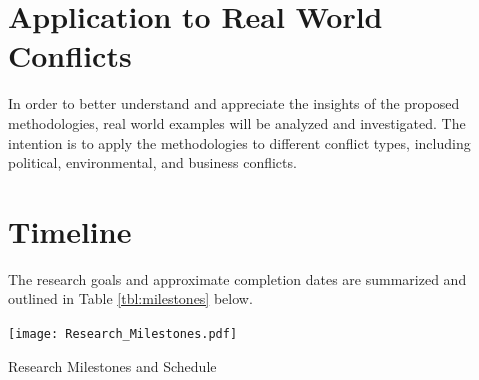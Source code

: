 \documentclass[letterpaper,12pt,titlepage,oneside,final]{book}
\let\origdoublepage\cleardoublepage
\newcommand{\clearemptydoublepage}{%
  \clearpage{\pagestyle{empty}\origdoublepage}}
\let\cleardoublepage\clearemptydoublepage
\begin{document}
\section{Application to Real World Conflicts}
In order to better understand and appreciate the insights of the proposed methodologies, real world examples will be analyzed and investigated. The intention is to apply the methodologies to different conflict types, including political, environmental, and business conflicts.
\section{Timeline}
The research goals and approximate completion dates are summarized and outlined in Table \ref{tbl:milestones} below.
\begin{table}[H]
\centering
\texttt{[image: Research\_Milestones.pdf]}

\caption{Research Milestones and Schedule}

\label{tbl:milestones}
\end{table}





\cleardoublepage %
\renewcommand*{\bibname}{References}





\end{document}
